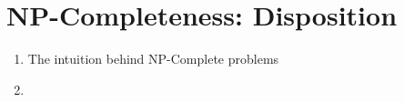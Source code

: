 \section{NP-Completeness: Disposition}
\begin{enumerate}
	\item The intuition behind NP-Complete problems
	\item 
\end{enumerate}